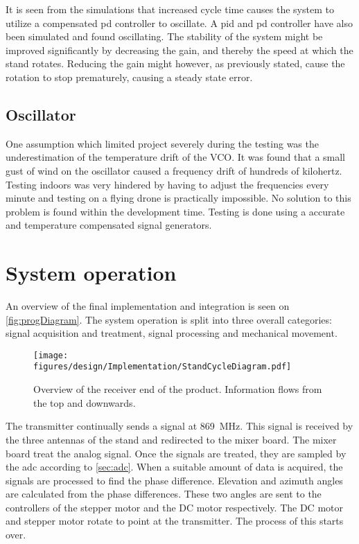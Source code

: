 It is seen from the simulations that increased cycle time causes the system to utilize a compensated \gls{pd} controller to oscillate. A \gls{pid} and \gls{pd} controller have also been simulated and found oscillating. The stability of the system might be improved significantly by decreasing the gain, and thereby the speed at which the stand rotates. Reducing the gain might however, as previously stated, cause the rotation to stop prematurely, causing a steady state error.


\subsection{Oscillator}
One assumption which limited project severely during the testing was the underestimation of the temperature drift of the VCO. It was found that a small gust of wind on the oscillator caused a frequency drift of hundreds of kilohertz. Testing indoors was very hindered by having to adjust the frequencies every minute and testing on a flying drone is practically impossible.
No solution to this problem is found within the development time. Testing is done using a accurate and temperature compensated signal generators.

\section{System operation}
An overview of the final implementation and integration is seen on \autoref{fig:progDiagram}. The system operation is split into three overall categories: signal acquisition and treatment, signal processing and  mechanical movement.

\begin{figure} [h]
	\centering
	\texttt{[image: figures/design/Implementation/StandCycleDiagram.pdf]}
	\caption{Overview of the receiver end of the product. Information flows from the top and downwards.}
	\label{fig:progDiagram}
\end{figure}

The transmitter continually sends a signal at \SI{869}{\mega\hertz}. This signal is received by the three antennas of the stand and redirected to the mixer board. The mixer board treat the analog signal. 
Once the signals are treated, they are sampled by the \gls{adc} according to \autoref{sec:adc}. When a suitable amount of data is acquired, the signals are processed to find the phase difference. Elevation and azimuth angles are calculated from the phase differences.
These two angles are sent to the controllers of the stepper motor and the DC motor respectively. The DC motor and stepper motor rotate to point at the transmitter. The process of this starts over.

